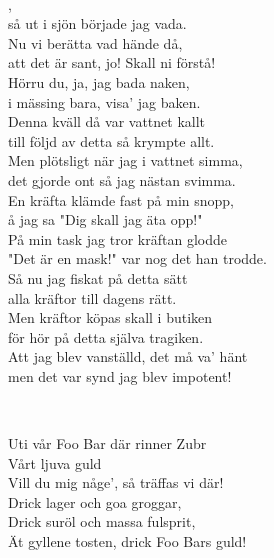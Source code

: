 \newpage


 \\       
\author{Text: Martin Johnsson}

, \\
så ut i sjön började jag vada. \\
Nu vi berätta vad hände då,\\
att det är sant, jo! Skall ni förstå!\\
Hörru du, ja, jag bada naken,\\
i mässing bara, visa' jag baken.\\
Denna kväll då var vattnet kallt\\
till följd av detta så krympte allt.\\
Men plötsligt när jag i vattnet simma,\\
det gjorde ont så jag nästan svimma.\\
En kräfta klämde fast på min snopp,\\
å jag sa "Dig skall jag äta opp!"\\
På min task jag tror kräftan glodde\\
"Det är en mask!" var nog det han trodde.\\
Så nu jag fiskat på detta sätt\\
alla kräftor till dagens rätt.\\
Men kräftor köpas skall i butiken\\
för hör på detta själva tragiken.\\
Att jag blev vanställd, det må va' hänt\\
men det var synd jag blev impotent!


\newpage

 \\       
\author{Text: Britney}

\songtext{} 
Uti vår Foo Bar där rinner Zubr\\
Vårt ljuva guld\\
Vill du mig någe', så träffas vi där!\\
Drick lager och goa groggar,\\
Drick suröl och massa fulsprit,\\
Ät gyllene tosten, drick Foo Bars guld!

